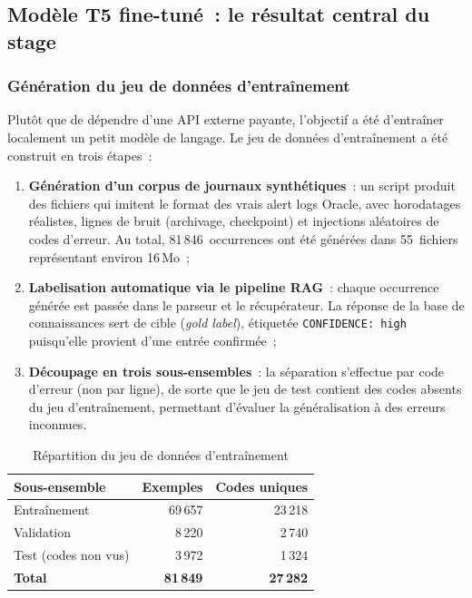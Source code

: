 \documentclass[12pt,a4paper]{report}
\begin{document}
\subsection{Mod\`ele T5 fine-tun\'e~: le r\'esultat central du stage}

\subsubsection{G\'en\'eration du jeu de donn\'ees d'entra\^inement}

Plut\^ot que de d\'ependre d'une API externe payante, l'objectif a \'et\'e d'entra\^iner
localement un petit mod\`ele de langage. Le jeu de donn\'ees d'entra\^inement a \'et\'e
construit en trois \'etapes~:

\begin{enumerate}[leftmargin=*]
  \item \textbf{G\'en\'eration d'un corpus de journaux synth\'etiques}~: un script produit
        des fichiers qui imitent le format des vrais alert logs Oracle, avec horodatages
        r\'ealistes, lignes de bruit (archivage, checkpoint) et injections al\'eatoires
        de codes d'erreur. Au total, 81\,846~occurrences ont \'et\'e g\'en\'er\'ees dans
        55~fichiers repr\'esentant environ 16\,Mo~;
  \item \textbf{Labelisation automatique via le pipeline RAG}~: chaque occurrence
        g\'en\'er\'ee est pass\'ee dans le parseur et le r\'ecup\'erateur. La r\'eponse de
        la base de connaissances sert de cible (\emph{gold label}), \'etiquet\'ee
        \texttt{CONFIDENCE: high} puisqu'elle provient d'une entr\'ee confirm\'ee~;
  \item \textbf{D\'ecoupage en trois sous-ensembles}~: la s\'eparation s'effectue par
        code d'erreur (non par ligne), de sorte que le jeu de test contient des codes
        absents du jeu d'entra\^inement, permettant d'\'evaluer la g\'en\'eralisation \`a
        des erreurs inconnues.
\end{enumerate}

\begin{table}[H]
  \centering
  \caption{R\'epartition du jeu de donn\'ees d'entra\^inement}
  \label{tab:splits}
  \begin{tabular}{lrr}
    \toprule
    \textbf{Sous-ensemble} & \textbf{Exemples} & \textbf{Codes uniques} \\
    \midrule
    Entra\^inement              & 69\,657 & 23\,218 \\
    Validation                  &  8\,220 &  2\,740 \\
    Test (codes non vus)        &  3\,972 &  1\,324 \\
    \midrule
    \textbf{Total}              & \textbf{81\,849} & \textbf{27\,282} \\
    \bottomrule
  \end{tabular}
\end{table}
\end{document}

